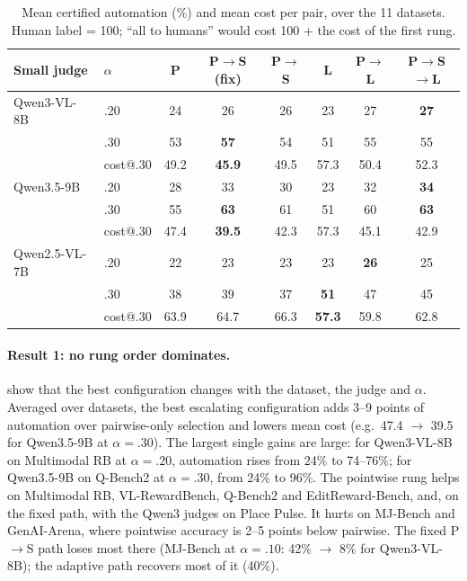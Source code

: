 \begin{table}[t]
\centering\small
\caption{Mean certified automation (\%) and mean cost per pair, over the 11 datasets. Human label = 100; ``all to humans'' would cost 100 + the cost of the first rung.}\label{tab:ladder-mean}
\begin{tabular}{llcccccc}
\toprule
Small judge & $\alpha$ & P & P$\to$S (fix) & P$\to$S & L & P$\to$L & P$\to$S$\to$L\\
\midrule
Qwen3-VL-8B & .20 & 24 & 26 & 26 & 23 & 27 & \textbf{27}\\
            & .30 & 53 & \textbf{57} & 54 & 51 & 55 & 55\\
            & cost@.30 & 49.2 & \textbf{45.9} & 49.5 & 57.3 & 50.4 & 52.3\\
Qwen3.5-9B  & .20 & 28 & 33 & 30 & 23 & 32 & \textbf{34}\\
            & .30 & 55 & \textbf{63} & 61 & 51 & 60 & \textbf{63}\\
            & cost@.30 & 47.4 & \textbf{39.5} & 42.3 & 57.3 & 45.1 & 42.9\\
Qwen2.5-VL-7B & .20 & 22 & 23 & 23 & 23 & \textbf{26} & 25\\
            & .30 & 38 & 39 & 37 & \textbf{51} & 47 & 45\\
            & cost@.30 & 63.9 & 64.7 & 66.3 & \textbf{57.3} & 59.8 & 62.8\\
\bottomrule
\end{tabular}
\end{table}

\paragraph{Result 1: no rung order dominates.}
 show that the best configuration changes with the dataset, the judge and $\alpha$.
Averaged over datasets, the best escalating configuration adds 3--9 points of automation over pairwise-only selection and lowers mean cost (e.g.\ 47.4 $\to$ 39.5 for Qwen3.5-9B at $\alpha=.30$). The largest single gains are large: for Qwen3-VL-8B on Multimodal RB at $\alpha=.20$, automation rises from 24\% to 74--76\%; for Qwen3.5-9B on Q-Bench2 at $\alpha=.30$, from 24\% to 96\%.
The pointwise rung helps on Multimodal RB, VL-RewardBench, Q-Bench2 and EditReward-Bench, and, on the fixed path, with the Qwen3 judges on Place Pulse. It hurts on MJ-Bench and GenAI-Arena, where pointwise accuracy is 2--5 points below pairwise. The fixed P$\to$S path loses most there (MJ-Bench at $\alpha=.10$: 42\% $\to$ 8\% for Qwen3-VL-8B); the adaptive path recovers most of it (40\%).

